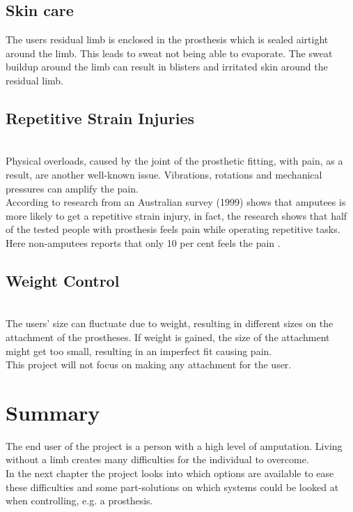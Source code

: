 \subsection*{Skin care}
The users residual limb is enclosed in the prosthesis which is sealed airtight around the limb. This leads to sweat not being able to evaporate. The sweat buildup around the limb can result in blisters and irritated skin around the residual limb\cite{SkinCare}.\\

\subsection*{Repetitive Strain Injuries}\\
Physical overloads, caused by the joint of the prosthetic fitting, with pain, as a result, are another well-known issue. Vibrations, rotations and mechanical pressures can amplify the pain.\\
According to research from an Australian survey (1999)  shows that amputees is more likely to get a repetitive strain injury, in fact, the research shows that half of the tested people with prosthesis feels pain while operating repetitive tasks. Here non-amputees reports that only 10 per cent feels the pain \cite{StrainInjuries}.\\

\subsection*{Weight Control}\\
The users' size can fluctuate due to weight, resulting in different sizes on the attachment of the prostheses. If weight is gained, the size of the attachment might get too small, resulting in an imperfect fit causing pain\cite{weightControl}.\\
This project will not focus on making any attachment for the user.

\section{Summary}
The end user of the project is a person with a high level of amputation. Living without a limb creates many difficulties for the individual to overcome.\\
In the next chapter the project looks into which options are available to ease these difficulties and some part-solutions on which systems could be looked at when controlling, e.g. a prosthesis. 